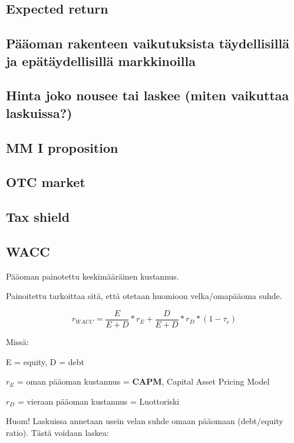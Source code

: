 \documentclass[a4paper]{article}
\begin{document}
\subsection{Expected return}

\subsection{Pääoman rakenteen vaikutuksista täydellisillä ja epätäydellisillä markkinoilla}

\subsection{Hinta joko nousee tai laskee (miten vaikuttaa laskuissa?)}


\subsection{MM I proposition}

\subsection{OTC market}

\subsection{Tax shield}

\subsection{WACC}

Pääoman painotettu keskimääräinen kustannus.

Painoitettu tarkoittaa sitä, että otetaan huomioon velka/omapääoma suhde.

\[
r_{WACC} = \frac{E}{E + D} * r_E + \frac{D}{E + D} * r_D * (1 - \tau_c)
\]

Missä: 

E = equity, D = debt

$r_E$ = oman pääoman kustannus = \textbf{CAPM}, Capital Asset Pricing Model

$r_D$ = vieraan pääoman kustannus = Luottoriski

Huom! Laskuissa annetaan usein velan suhde omaan pääomaan (debt/equity ratio). Tästä voidaan laskea:
\end{document}
